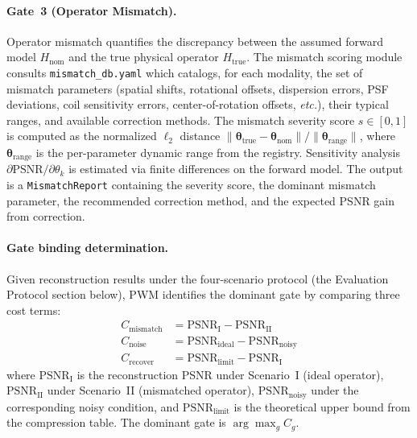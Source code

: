 \documentclass[11pt]{article}
\newcommand{\etc}{\textit{etc.}}
\newcommand{\Hnom}{H_{\mathrm{nom}}}
\newcommand{\Htrue}{H_{\mathrm{true}}}
\newcommand{\psnr}{\mathrm{PSNR}}
\begin{document}
\paragraph{Gate~3 (Operator Mismatch).}
Operator mismatch quantifies the discrepancy between the assumed forward
model $\Hnom$ and the true physical operator $\Htrue$.  The
mismatch scoring module consults \texttt{mismatch\_db.yaml}
which catalogs, for each modality, the set of mismatch parameters
(spatial shifts, rotational offsets, dispersion errors, PSF deviations,
coil sensitivity errors, center-of-rotation offsets, \etc{}), their
typical ranges, and available correction methods.  The mismatch severity
score $s \in [0, 1]$ is computed as the normalized $\ell_2$ distance
$\| \boldsymbol{\theta}_{\text{true}} - \boldsymbol{\theta}_{\text{nom}} \|
/ \| \boldsymbol{\theta}_{\text{range}} \|$, where
$\boldsymbol{\theta}_{\text{range}}$ is the per-parameter dynamic range
from the registry.  Sensitivity analysis $\partial \psnr / \partial
\theta_k$ is estimated via finite differences on the forward model.  The
output is a \texttt{MismatchReport} containing the severity score, the
dominant mismatch parameter, the recommended correction method, and the
expected PSNR gain from correction.

\paragraph{Gate binding determination.}
Given reconstruction results under the four-scenario protocol
(the Evaluation Protocol section below), PWM identifies the dominant gate by
comparing three cost terms:
\begin{align}
  C_{\text{mismatch}} &= \psnr_{\text{I}} - \psnr_{\text{II}} \label{eq:cost_mismatch} \\
  C_{\text{noise}}    &= \psnr_{\text{ideal}} - \psnr_{\text{noisy}} \label{eq:cost_noise} \\
  C_{\text{recover}}  &= \psnr_{\text{limit}} - \psnr_{\text{I}} \label{eq:cost_recover}
\end{align}
where $\psnr_{\text{I}}$ is the reconstruction PSNR under Scenario~I
(ideal operator), $\psnr_{\text{II}}$ under Scenario~II (mismatched
operator), $\psnr_{\text{noisy}}$ under the corresponding noisy condition,
and $\psnr_{\text{limit}}$ is the theoretical upper bound from the
compression table.  The dominant gate is $\arg\max_g C_g$.
\end{document}
